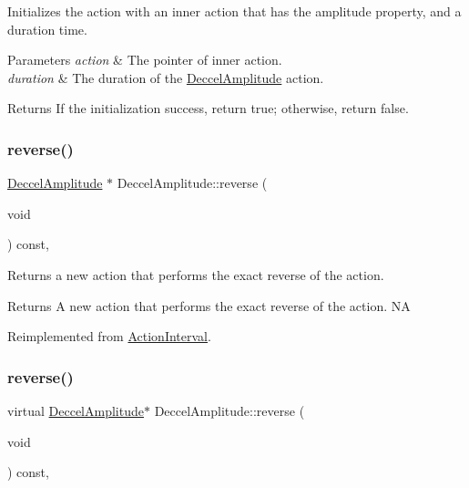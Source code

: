 Initializes the action with an inner action that has the amplitude property, and a duration time. 


\begin{DoxyParams}{Parameters}
{\em action} & The pointer of inner action. \\
\hline
{\em duration} & The duration of the \hyperlink{classDeccelAmplitude}{Deccel\+Amplitude} action. \\
\hline
\end{DoxyParams}
\begin{DoxyReturn}{Returns}
If the initialization success, return true; otherwise, return false. 
\end{DoxyReturn}
\mbox{\label{classDeccelAmplitude_a57d1d15a1bfb1a397a78f21ae6d54d92}} 
\subsubsection{\texorpdfstring{reverse()}{reverse()}\hspace{0.1cm}{\footnotesize\ttfamily [1/2]}}
{\footnotesize\ttfamily \hyperlink{classDeccelAmplitude}{Deccel\+Amplitude} $\ast$ Deccel\+Amplitude\+::reverse (\begin{DoxyParamCaption}\item[{void}]{ }\end{DoxyParamCaption}) const\hspace{0.3cm}{\ttfamily [override]}, {\ttfamily [virtual]}}

Returns a new action that performs the exact reverse of the action.

\begin{DoxyReturn}{Returns}
A new action that performs the exact reverse of the action.  NA 
\end{DoxyReturn}


Reimplemented from \hyperlink{classActionInterval_a9f9ac7164036a0bc261a72f62a2b2da7}{Action\+Interval}.

\mbox{\label{classDeccelAmplitude_a4720cda1d91ad11b91674a821eff6dce}} 
\subsubsection{\texorpdfstring{reverse()}{reverse()}\hspace{0.1cm}{\footnotesize\ttfamily [2/2]}}
{\footnotesize\ttfamily virtual \hyperlink{classDeccelAmplitude}{Deccel\+Amplitude}$\ast$ Deccel\+Amplitude\+::reverse (\begin{DoxyParamCaption}\item[{void}]{ }\end{DoxyParamCaption}) const\hspace{0.3cm}{\ttfamily [override]}, {\ttfamily [virtual]}}

